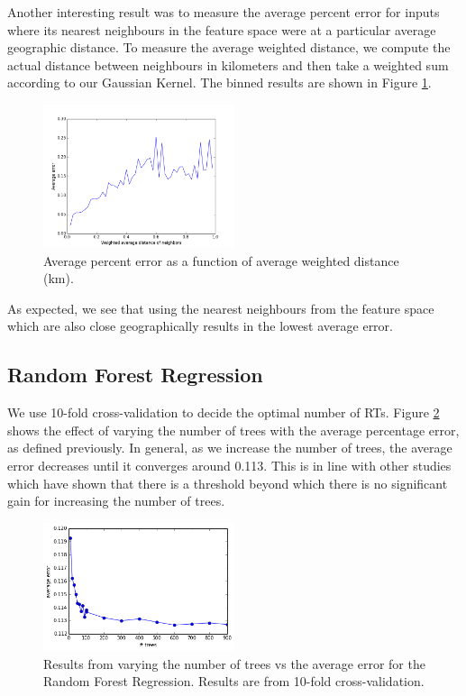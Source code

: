 \documentclass[conference]{IEEEtran}
\begin{document}
Another interesting result was to measure the average percent error for inputs where its nearest neighbours in the feature space were at a particular average geographic distance. To measure the average weighted distance, we compute the actual distance between neighbours in kilometers and then take a weighted sum according to our Gaussian Kernel. The binned results are shown in Figure \ref{knnBin}.
\begin{figure}[H]
\centering
\includegraphics[width=0.5\textwidth]{error_vs_distance_k100_v04.png}
\caption{\scriptsize Average percent error as a function of average weighted distance (km).}
\label{knnBin}
\end{figure}
As expected, we see that using the nearest neighbours from the feature space which are also close geographically results in the lowest average error. 

\subsection{Random Forest Regression}
We use 10-fold cross-validation to decide the optimal number of RTs. Figure \ref{rf_benchmark} shows the effect of varying the number of trees with the average percentage error, as defined previously. In general, as we increase the number of trees, the average error decreases until it converges around 0.113. This is in line with other studies which have shown that there is a threshold beyond which there is no significant gain for increasing the number of trees\cite{Oshiro2012}.

\begin{figure}[H]
\centering
\includegraphics[width=0.5\textwidth]{rf_benchmark.png}
\caption{\scriptsize Results from varying the number of trees vs the average error for the Random Forest Regression. Results are from 10-fold cross-validation.}
\label{rf_benchmark}
\end{figure}
\end{document}
